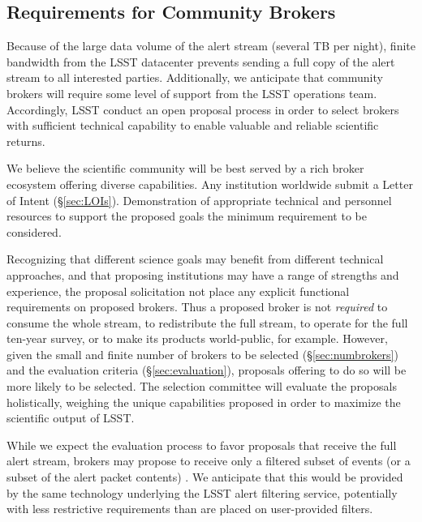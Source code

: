 \subsection{Requirements for Community Brokers}

Because of the large data volume of the alert stream (several TB per night), finite bandwidth from the LSST datacenter prevents sending a full copy of the alert stream to all interested parties.
Additionally, we anticipate that community brokers will require some level of support from the LSST operations team.
Accordingly, LSST  conduct an open proposal process in order to select brokers with sufficient technical capability to enable valuable and reliable scientific returns.

We believe the scientific community will be best served by a rich broker ecosystem offering diverse capabilities.
Any institution worldwide  submit a Letter of Intent (\S \ref{sec:LOIs}). 
Demonstration of appropriate technical and personnel resources to support the proposed goals  the minimum requirement to be considered.

Recognizing that different science goals may benefit from different technical approaches, and that proposing institutions may have a range of strengths and experience, the proposal solicitation  not place any explicit functional requirements on proposed brokers.
Thus a proposed broker is not \textit{required} to consume the whole stream, to redistribute the full stream, to operate for the full ten-year survey, or to make its products world-public, for example.
However, given the small and finite number of brokers to be selected (\S \ref{sec:numbrokers}) and the evaluation criteria (\S \ref{sec:evaluation}), proposals offering to do so will be more likely to be selected.
The selection committee will evaluate the proposals holistically, weighing the unique capabilities proposed in order to maximize the scientific output of LSST.

While we expect the evaluation process to favor proposals that receive the full alert stream, brokers may propose to receive only a filtered subset of events (or a subset of the alert packet contents) .
We anticipate that this  would be provided by the same technology underlying the LSST alert filtering service, potentially with less restrictive requirements than are placed on user-provided filters.

